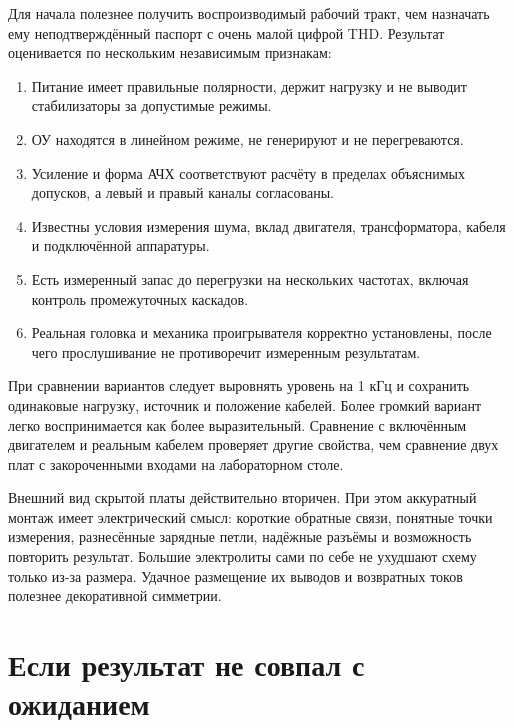 \documentclass[a4paper,11pt]{article}
\begin{document}
Для начала полезнее получить воспроизводимый рабочий тракт, чем назначать ему
неподтверждённый паспорт с очень малой цифрой THD. Результат оценивается
по нескольким независимым признакам:
\begin{enumerate}
\item Питание имеет правильные полярности, держит нагрузку и не выводит
стабилизаторы за допустимые режимы.
\item ОУ находятся в линейном режиме, не генерируют и не перегреваются.
\item Усиление и форма АЧХ соответствуют расчёту в пределах объяснимых
допусков, а левый и правый каналы согласованы.
\item Известны условия измерения шума, вклад двигателя, трансформатора,
кабеля и подключённой аппаратуры.
\item Есть измеренный запас до перегрузки на нескольких частотах,
включая контроль промежуточных каскадов.
\item Реальная головка и механика проигрывателя корректно установлены,
после чего прослушивание не противоречит измеренным результатам.
\end{enumerate}

При сравнении вариантов следует выровнять уровень на 1 кГц и сохранить
одинаковые нагрузку, источник и положение кабелей. Более громкий вариант
легко воспринимается как более выразительный. Сравнение с включённым
двигателем и реальным кабелем проверяет другие свойства, чем сравнение
двух плат с закороченными входами на лабораторном столе.

Внешний вид скрытой платы действительно вторичен. При этом аккуратный монтаж
имеет электрический смысл: короткие обратные связи, понятные точки измерения,
разнесённые зарядные петли, надёжные разъёмы и возможность повторить результат.
Большие электролиты сами по себе не ухудшают схему только из-за размера.
Удачное размещение их выводов и возвратных токов полезнее декоративной симметрии.

\section{Если результат не совпал с ожиданием}
\end{document}
